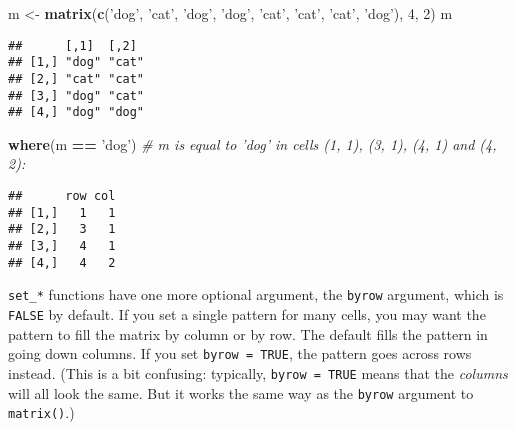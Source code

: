 \documentclass[]{article}
\newenvironment{Shaded}{\begin{snugshade}}{\end{snugshade}}
\newcommand{\CommentTok}[1]{\textcolor[rgb]{0.56,0.35,0.01}{\textit{#1}}}
\newcommand{\DecValTok}[1]{\textcolor[rgb]{0.00,0.00,0.81}{#1}}
\newcommand{\KeywordTok}[1]{\textcolor[rgb]{0.13,0.29,0.53}{\textbf{#1}}}
\newcommand{\NormalTok}[1]{#1}
\newcommand{\OperatorTok}[1]{\textcolor[rgb]{0.81,0.36,0.00}{\textbf{#1}}}
\newcommand{\StringTok}[1]{\textcolor[rgb]{0.31,0.60,0.02}{#1}}
\begin{document}
\begin{Shaded}
\begin{Highlighting}[]
\NormalTok{m <-}\StringTok{ }\KeywordTok{matrix}\NormalTok{(}\KeywordTok{c}\NormalTok{(}\StringTok{'dog'}\NormalTok{, }\StringTok{'cat'}\NormalTok{, }\StringTok{'dog'}\NormalTok{, }\StringTok{'dog'}\NormalTok{, }\StringTok{'cat'}\NormalTok{, }\StringTok{'cat'}\NormalTok{, }\StringTok{'cat'}\NormalTok{, }\StringTok{'dog'}\NormalTok{), }\DecValTok{4}\NormalTok{, }\DecValTok{2}\NormalTok{)}
\NormalTok{m}
\end{Highlighting}
\end{Shaded}

\begin{verbatim}
##      [,1]  [,2] 
## [1,] "dog" "cat"
## [2,] "cat" "cat"
## [3,] "dog" "cat"
## [4,] "dog" "dog"
\end{verbatim}

\begin{Shaded}
\begin{Highlighting}[]
\KeywordTok{where}\NormalTok{(m }\OperatorTok{==}\StringTok{ 'dog'}\NormalTok{) }\CommentTok{# m is equal to 'dog' in cells (1, 1), (3, 1), (4, 1) and (4, 2):}
\end{Highlighting}
\end{Shaded}

\begin{verbatim}
##      row col
## [1,]   1   1
## [2,]   3   1
## [3,]   4   1
## [4,]   4   2
\end{verbatim}

\FloatBarrier

\texttt{set\_*} functions have one more optional argument, the
\texttt{byrow} argument, which is \texttt{FALSE} by default. If you set
a single pattern for many cells, you may want the pattern to fill the
matrix by column or by row. The default fills the pattern in going down
columns. If you set \texttt{byrow\ =\ TRUE}, the pattern goes across
rows instead. (This is a bit confusing: typically,
\texttt{byrow\ =\ TRUE} means that the \emph{columns} will all look the
same. But it works the same way as the \texttt{byrow} argument to
\texttt{matrix()}.)
\end{document}
